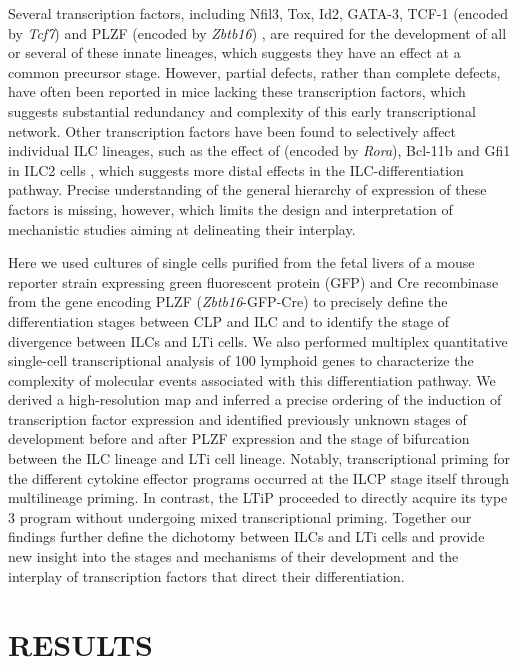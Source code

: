 Several transcription factors, including Nfil3, Tox, Id2, GATA-3, TCF-1 (encoded by \textit{Tcf7}) and PLZF (encoded by \textit{Zbtb16}) \cite{constantinides2014,yu2014,xu2015,seillet2014,seehus2015, hoyler2012,serafini2014,yagi2014,yang2013,mielke2013,moro2010}, are required for the development of all or several of these innate lineages, which suggests they have an effect at a common precursor stage. However, partial defects, rather than complete defects, have often been reported in mice lacking these transcription factors, which suggests substantial redundancy and complexity of this early transcriptional network. Other transcription factors have been found to selectively affect individual ILC lineages, such as the effect of \RORa{} (encoded by \textit{Rora}), Bcl-11b and Gfi1 in ILC2 cells \cite{wong2012,spooner2013,walker2015}, which suggests more distal effects in the ILC-differentiation pathway. Precise understanding of the general hierarchy of expression of these factors is missing, however, which limits the design and interpretation of mechanistic studies aiming at delineating their interplay.

Here we used cultures of single cells purified from the fetal livers of a mouse reporter strain expressing green fluorescent protein (GFP) and Cre recombinase from the gene encoding PLZF (\textit{Zbtb16}-GFP-Cre) to precisely define the differentiation stages between CLP and ILC and to identify the stage of divergence between ILCs and LTi cells. We also performed multiplex quantitative single-cell transcriptional analysis of 100 lymphoid genes to characterize the complexity of molecular events associated with this differentiation pathway. We derived a high-resolution map and inferred a precise ordering of the induction of transcription factor expression and identified previously unknown stages of development before and after PLZF expression and the stage of bifurcation between the ILC lineage and LTi cell lineage. Notably, transcriptional priming for the different cytokine effector programs occurred at the ILCP stage itself through multilineage priming. In contrast, the LTiP proceeded to directly acquire its type 3 program without undergoing mixed transcriptional priming. Together our findings further define the dichotomy between ILCs and LTi cells and provide new insight into the stages and mechanisms of their development and the interplay of transcription factors that direct their differentiation.

\section{RESULTS}

